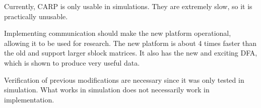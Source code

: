 
Currently, CARP is only usable in simulations.
They are extremely slow, so it is practically unusable.

Implementing communication should make the new platform operational, allowing it to be used for research.
The new platform is about 4 times faster than the old and support larger sblock matrices.
It also has the new and exciting DFA, which is shown to produce very useful data.

Verification of previous modifications are necessary since it was only tested in simulation.
What works in simulation does not necessarily work in implementation.

